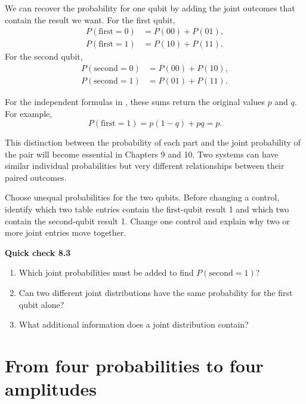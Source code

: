 We can recover the probability for one qubit by adding the joint outcomes that contain the result we want. For the first qubit,
\begin{align}
P(\text{first}=0)&=P(00)+P(01),\\
P(\text{first}=1)&=P(10)+P(11).
\end{align}
For the second qubit,
\begin{align}
P(\text{second}=0)&=P(00)+P(10),\\
P(\text{second}=1)&=P(01)+P(11).
\end{align}

For the independent formulas in , these sums return the original values $p$ and $q$. For example,
\begin{equation}
P(\text{first}=1)=p(1-q)+pq=p.
\end{equation}

This distinction between the probability of each part and the joint probability of the pair will become essential in Chapters 9 and 10. Two systems can have similar individual probabilities but very different relationships between their paired outcomes.

\begin{appactivity}
Choose unequal probabilities for the two qubits. Before changing a control, identify which two table entries contain the first-qubit result 1 and which two contain the second-qubit result 1. Change one control and explain why two or more joint entries move together.
\end{appactivity}

\begin{checkpoint}
\textbf{Quick check 8.3}
\begin{enumerate}
  \item Which joint probabilities must be added to find $P(\text{second}=1)$?
  \item Can two different joint distributions have the same probability for the first qubit alone?
  \item What additional information does a joint distribution contain?
\end{enumerate}
\end{checkpoint}

\section{From four probabilities to four amplitudes}
\label{sec:ch08-two-qubit-state}

